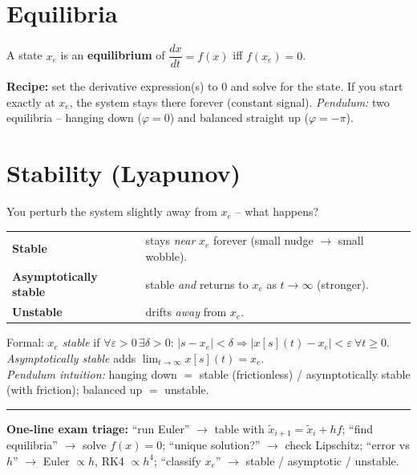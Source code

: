 \section{Equilibria}
\begin{keybox}
\centering A state $x_e$ is an \textbf{equilibrium} of $\dfrac{dx}{dt}=f(x)$ \;iff\; $f(x_e)=0$.
\end{keybox}
\textbf{Recipe:} set the derivative expression(s) to $0$ and solve for the state.
If you start exactly at $x_e$, the system stays there forever (constant signal).
\textit{Pendulum:} two equilibria -- hanging down ($\varphi=0$) and balanced straight up ($\varphi=-\pi$).

\section{Stability (Lyapunov)}
You perturb the system slightly away from $x_e$ -- what happens?
\begin{keybox}
\begin{tabular}{@{}ll@{}}
\textbf{Stable} & stays \emph{near} $x_e$ forever (small nudge $\to$ small wobble).\\
\textbf{Asymptotically stable} & stable \emph{and} returns to $x_e$ as $t\to\infty$ (stronger).\\
\textbf{Unstable} & drifts \emph{away} from $x_e$.
\end{tabular}
\end{keybox}
Formal: $x_e$ \emph{stable} if $\forall\varepsilon>0\,\exists\delta>0$: $|s-x_e|<\delta\Rightarrow |x[s](t)-x_e|<\varepsilon\ \forall t\ge0$.
\emph{Asymptotically stable} adds $\lim_{t\to\infty}x[s](t)=x_e$.\\
\textit{Pendulum intuition:} hanging down $=$ stable (frictionless) / asymptotically stable (with friction); balanced up $=$ unstable.

\vspace{3pt}
\hrule
\vspace{2pt}
{\footnotesize\textbf{One-line exam triage:} ``run Euler'' $\to$ table with $\tilde x_{i+1}=\tilde x_i+h f$; ``find equilibria'' $\to$ solve $f(x)=0$; ``unique solution?'' $\to$ check Lipschitz; ``error vs $h$'' $\to$ Euler $\propto h$, RK4 $\propto h^4$; ``classify $x_e$'' $\to$ stable / asymptotic / unstable.}
